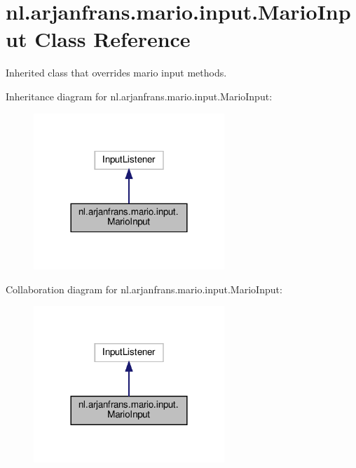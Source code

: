 \hypertarget{classnl_1_1arjanfrans_1_1mario_1_1input_1_1MarioInput}{}\section{nl.\+arjanfrans.\+mario.\+input.\+Mario\+Input Class Reference}
\label{classnl_1_1arjanfrans_1_1mario_1_1input_1_1MarioInput}


Inherited class that overrides mario input methods.  




Inheritance diagram for nl.\+arjanfrans.\+mario.\+input.\+Mario\+Input\+:\nopagebreak
\begin{figure}[H]
\begin{center}
\leavevmode
\includegraphics[width=204pt]{classnl_1_1arjanfrans_1_1mario_1_1input_1_1MarioInput__inherit__graph}
\end{center}
\end{figure}


Collaboration diagram for nl.\+arjanfrans.\+mario.\+input.\+Mario\+Input\+:\nopagebreak
\begin{figure}[H]
\begin{center}
\leavevmode
\includegraphics[width=204pt]{classnl_1_1arjanfrans_1_1mario_1_1input_1_1MarioInput__coll__graph}
\end{center}
\end{figure}
